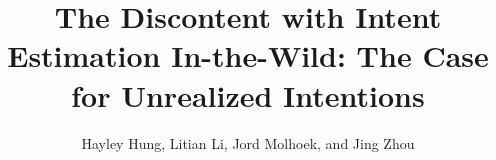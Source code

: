 \documentclass[manuscript,screen,review]{acmart}
\begin{document}


\title{The Discontent with Intent Estimation In-the-Wild: The Case for Unrealized Intentions}

\author{Hayley Hung, Litian Li,  Jord Molhoek, and  Jing Zhou}











\end{document}
